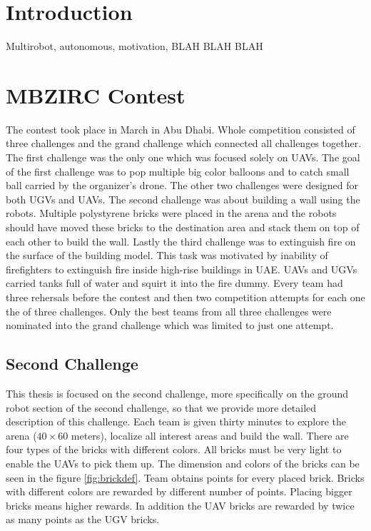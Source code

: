 \section{Introduction}
Multirobot, autonomous, motivation, BLAH BLAH BLAH


\section{MBZIRC Contest}
The contest took place in March in Abu Dhabi. Whole competition consisted of three challenges and the grand challenge which connected all challenges together. The first challenge was the only one which was focused solely on UAVs. The goal of the first challenge was to pop multiple big color balloons and to catch small ball carried by the organizer's drone. The other two challenges were designed for both UGVs and UAVs. The second challenge was about building a wall using the robots. Multiple polystyrene bricks were placed in the arena and the robots should have moved these bricks to the destination area and stack them on top of each other to build the wall. Lastly the third challenge was to extinguish fire on the surface of the building model. This task was motivated by inability of firefighters to extinguish fire inside high-rise buildings in UAE. UAVs and UGVs carried tanks full of water and squirt it into the fire dummy. Every team had three rehersals before the contest and then two competition attempts for each one the of three challenges. Only the best teams from all three challenges were nominated into the grand challenge which was limited to just one attempt.

\subsection{Second Challenge}
This thesis is focused on the second challenge, more specifically on the ground robot section of the second challenge, so that we provide more detailed description of this challenge. Each team is given thirty minutes to explore the arena ($40 \times 60$ meters), localize all interest areas and build the wall. There are four types of the bricks with different colors. All bricks must be very light to enable the UAVs to pick them up. The dimension and colors of the bricks can be seen in the figure \ref{fig:brickdef}. Team obtains points for every placed brick. Bricks with different colors are rewarded by different number of points. Placing bigger bricks means higher rewards. In addition the UAV bricks are rewarded by twice as many points as the UGV bricks.

